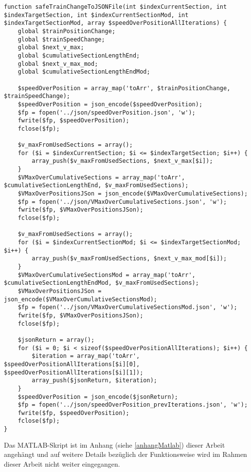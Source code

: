 \begin{lstlisting}[caption={\textit{safeTrainChangeToJSONFile$($$)$}},captionpos=b,label={lst:safeTrainChangeToJSONFile}]
function safeTrainChangeToJSONFile(int $indexCurrentSection, int $indexTargetSection, int $indexCurrentSectionMod, int $indexTargetSectionMod, array $speedOverPositionAllIterations) {
	global $trainPositionChange;
	global $trainSpeedChange;
	global $next_v_max;
	global $cumulativeSectionLengthEnd;
	global $next_v_max_mod;
	global $cumulativeSectionLengthEndMod;

	$speedOverPosition = array_map('toArr', $trainPositionChange, $trainSpeedChange);
	$speedOverPosition = json_encode($speedOverPosition);
	$fp = fopen('../json/speedOverPosition.json', 'w');
	fwrite($fp, $speedOverPosition);
	fclose($fp);

	$v_maxFromUsedSections = array();
	for ($i = $indexCurrentSection; $i <= $indexTargetSection; $i++) {
		array_push($v_maxFromUsedSections, $next_v_max[$i]);
	}
	$VMaxOverCumulativeSections = array_map('toArr', $cumulativeSectionLengthEnd, $v_maxFromUsedSections);
	$VMaxOverPositionsJSon = json_encode($VMaxOverCumulativeSections);
	$fp = fopen('../json/VMaxOverCumulativeSections.json', 'w');
	fwrite($fp, $VMaxOverPositionsJSon);
	fclose($fp);

	$v_maxFromUsedSections = array();
	for ($i = $indexCurrentSectionMod; $i <= $indexTargetSectionMod; $i++) {
		array_push($v_maxFromUsedSections, $next_v_max_mod[$i]);
	}
	$VMaxOverCumulativeSectionsMod = array_map('toArr', $cumulativeSectionLengthEndMod, $v_maxFromUsedSections);
	$VMaxOverPositionsJSon = json_encode($VMaxOverCumulativeSectionsMod);
	$fp = fopen('../json/VMaxOverCumulativeSectionsMod.json', 'w');
	fwrite($fp, $VMaxOverPositionsJSon);
	fclose($fp);

	$jsonReturn = array();
	for ($i = 0; $i < sizeof($speedOverPositionAllIterations); $i++) {
		$iteration = array_map('toArr', $speedOverPositionAllIterations[$i][0], $speedOverPositionAllIterations[$i][1]);
		array_push($jsonReturn, $iteration);
	}
	$speedOverPosition = json_encode($jsonReturn);
	$fp = fopen('../json/speedOverPosition_prevIterations.json', 'w');
	fwrite($fp, $speedOverPosition);
	fclose($fp);
}
\end{lstlisting}
Das MATLAB-Skript ist im Anhang (siehe \ref{anhangMatlab}) dieser Arbeit angehängt und auf weitere Details bezüglich der Funktionsweise wird im Rahmen dieser Arbeit nicht weiter eingegangen.